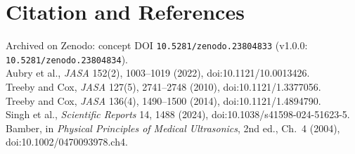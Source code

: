 \documentclass[11pt]{article}
\begin{document}
\section*{Citation and References}
Archived on Zenodo: concept DOI \texttt{10.5281/zenodo.23804833} (v1.0.0: \texttt{10.5281/zenodo.23804834}).\\
Aubry et al., \textit{JASA} 152(2), 1003--1019 (2022), doi:10.1121/10.0013426.\\
Treeby and Cox, \textit{JASA} 127(5), 2741--2748 (2010), doi:10.1121/1.3377056.\\
Treeby and Cox, \textit{JASA} 136(4), 1490--1500 (2014), doi:10.1121/1.4894790.\\
Singh et al., \textit{Scientific Reports} 14, 1488 (2024), doi:10.1038/s41598-024-51623-5.\\
Bamber, in \textit{Physical Principles of Medical Ultrasonics}, 2nd ed., Ch.~4 (2004), doi:10.1002/0470093978.ch4.
\end{document}
